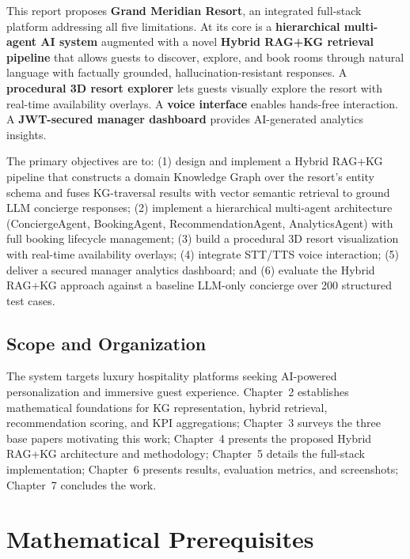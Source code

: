 \documentclass[11pt,a4paper]{report}
\begin{document}
This report proposes \textbf{Grand Meridian Resort}, an integrated full-stack platform addressing all five limitations. At its core is a \textbf{hierarchical multi-agent AI system} augmented with a novel \textbf{Hybrid RAG+KG retrieval pipeline} that allows guests to discover, explore, and book rooms through natural language with factually grounded, hallucination-resistant responses. A \textbf{procedural 3D resort explorer} lets guests visually explore the resort with real-time availability overlays. A \textbf{voice interface} enables hands-free interaction. A \textbf{JWT-secured manager dashboard} provides AI-generated analytics insights.

The primary objectives are to: (1) design and implement a Hybrid RAG+KG pipeline that constructs a domain Knowledge Graph over the resort's entity schema and fuses KG-traversal results with vector semantic retrieval to ground LLM concierge responses; (2) implement a hierarchical multi-agent architecture (ConciergeAgent, BookingAgent, RecommendationAgent, AnalyticsAgent) with full booking lifecycle management; (3) build a procedural 3D resort visualization with real-time availability overlays; (4) integrate STT/TTS voice interaction; (5) deliver a secured manager analytics dashboard; and (6) evaluate the Hybrid RAG+KG approach against a baseline LLM-only concierge over 200 structured test cases.

\section{Scope and Organization}

The system targets luxury hospitality platforms seeking AI-powered personalization and immersive guest experience. Chapter~2 establishes mathematical foundations for KG representation, hybrid retrieval, recommendation scoring, and KPI aggregations; Chapter~3 surveys the three base papers motivating this work; Chapter~4 presents the proposed Hybrid RAG+KG architecture and methodology; Chapter~5 details the full-stack implementation; Chapter~6 presents results, evaluation metrics, and screenshots; Chapter~7 concludes the work.

\chapter{Mathematical Prerequisites}
\end{document}
